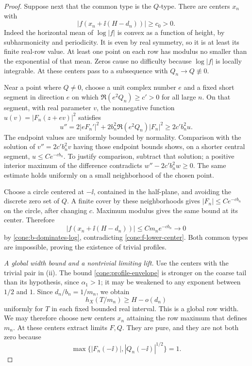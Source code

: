 \begin{proof}
Suppose next that the common type is the \(Q\)-type. There are centers
\(x_n\) with
\begin{equation}\label{cone:f-lower-center}
 |f(x_n+\ii(H-d_n))|\ge c_0>0.
\end{equation}
Indeed the horizontal mean of \(\log|f|\) is convex as a function of
height, by subharmonicity and periodicity. It is even by real symmetry,
so it is at least its finite real-row value. At least one point on
each row has modulus no smaller than the exponential of that mean.
Zeros cause no difficulty because \(\log|f|\) is locally integrable.
At these centers pass to a subsequence with \(Q_n\to Q\not\equiv0\).

Near a point where \(Q\ne0\), choose a unit complex number \(e\) and a
fixed short segment in direction \(e\) on which
\(\Re(e^2Q_n)\ge c'>0\) for all large \(n\). On that segment, with
real parameter \(v\), the nonnegative function
\(u(v)=|F_n(z+ev)|^2\) satisfies
\[
 u''=2|eF_n'|^2+2b_n^2\Re(e^2Q_n)|F_n|^2
 \ge 2c'b_n^2u.
\]
The endpoint values are uniformly bounded by normality. Comparison
with the solution of \(v''=2c'b_n^2v\) having those endpoint bounds
shows, on a shorter central segment,
\(u\le C e^{-c b_n}\). To justify comparison, subtract that solution;
a positive interior maximum of the difference contradicts
\(w''-2c'b_n^2w\ge0\). The same estimate holds uniformly on a small
neighborhood of the chosen point.

Choose a circle centered at \(-\ii\), contained in the half-plane,
and avoiding the discrete zero set of \(Q\). A finite cover by these
neighborhoods gives \(|F_n|\le C e^{-c b_n}\) on the circle, after
changing \(c\). Maximum modulus gives the same bound at its center.
Therefore
\[
 |f(x_n+\ii(H-d_n))|\le C m_ne^{-c b_n}\longrightarrow0
\]
by \eqref{cone:b-dominates-log}, contradicting
\eqref{cone:f-lower-center}. Both common types are impossible, proving
the existence of trivial profiles.

\medskip\noindent
\emph{A global width bound and a nontrivial limiting lift.}
Use the centers with the trivial pair in
\textup{(ii)}. The bound
\eqref{cone:profile-envelope} is stronger on the coarse tail than its
hypothesis, since \(\alpha_1>1\); it may be weakened to any exponent
between \(1/2\) and \(1\). Since \(d_n/b_n=1/m_n\), we obtain
\begin{equation}\label{cone:superlinear-width}
 h_X(T/m_n)\ge H-o(d_n)
\end{equation}
uniformly for \(T\) in each fixed bounded real interval. This is a
global row width. We may therefore choose new centers \(x_n\) attaining
the row maximum that defines \(m_n\). At these centers extract limits
\(F,Q\). They are pure, and they are not both zero because
\[
 \max\{|F_n(-\ii)|,|Q_n(-\ii)|^{1/2}\}=1.
\]


\end{proof}
